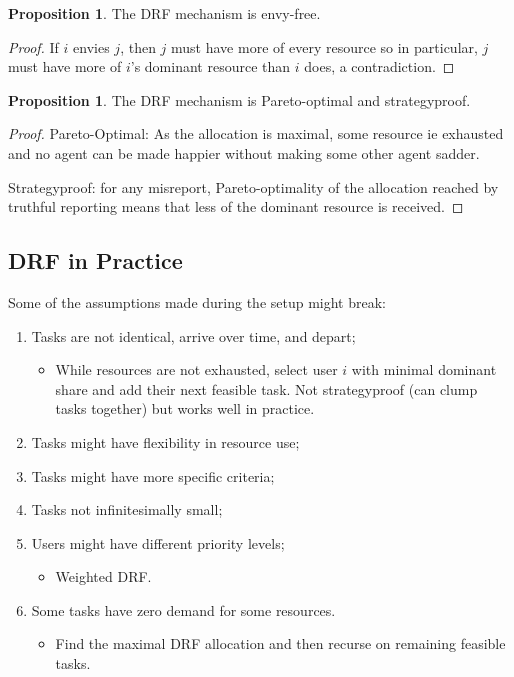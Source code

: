 \documentclass[dvipsnames]{article}
\theoremstyle{definition}
\newtheorem{proposition}[definition]{Proposition}
\theoremstyle{remark}
\begin{document}
\begin{proposition}
	The DRF mechanism is envy-free.
\end{proposition}

\begin{proof}
	If $i$ envies $j$, then $j$ must have more of every resource so in particular, $j$ must have more of $i$'s dominant resource than $i$ does, a contradiction.
\end{proof}


\begin{proposition}
	The DRF mechanism is Pareto-optimal and strategyproof.
\end{proposition}

\begin{proof}
	Pareto-Optimal: As the allocation is maximal, some resource ie exhausted and no agent can be made happier without making some other agent sadder.
	
	Strategyproof: for any misreport, Pareto-optimality of the allocation reached by truthful reporting means that less of the dominant resource is received.
\end{proof}

\subsection{DRF in Practice}

Some of the assumptions made during the setup might break:
\begin{enumerate}
	\item Tasks are not identical, arrive over time, and depart;
	\begin{itemize}
		\item While resources are not exhausted, select user $i$ with minimal dominant share and add their next feasible task. Not strategyproof (can clump tasks together) but works well in practice.
	\end{itemize}
	\item Tasks might have flexibility in resource use;
	\item Tasks might have more specific criteria;
	\item Tasks not infinitesimally small;
	\item Users might have different priority levels;
	\begin{itemize}
		\item Weighted DRF.
	\end{itemize}
	\item Some tasks have zero demand for some resources.
	\begin{itemize}
		\item Find the maximal DRF allocation and then recurse on remaining feasible tasks.
	\end{itemize}
\end{enumerate}
\end{document}
